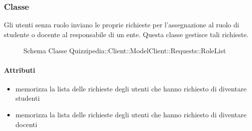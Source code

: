 \subsubsection{Classe }
Gli utenti senza ruolo inviano le proprie richieste per l'assegnazione al ruolo di studente o docente al responsabile di un ente. Questa classe gestisce tali richieste.
\begin{figure}[H]
\centering
\noindent{}
\caption[Schema Classe RoleList]{Schema Classe Quizzipedia::Client::ModelClient::Requests::RoleList}
\end{figure}
\paragraph{Attributi}
\begin{itemize}
\item {}
\newline
memorizza la lista delle richieste degli utenti che hanno richiesto di diventare studenti
\item {}
\newline
memorizza la lista delle richieste degli utenti che hanno richiesto di diventare docenti
\end{itemize}
